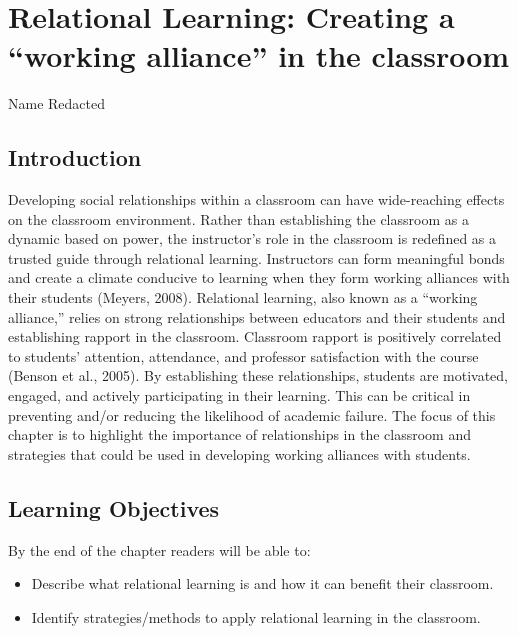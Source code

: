 \documentclass{book}
\begin{document}
\hypertarget{relational-learning-creating-a-working-alliance-in-the-classroom}{%
\chapter{Relational Learning: Creating a ``working alliance'' in the
classroom}\label{relational-learning-creating-a-working-alliance-in-the-classroom}}

Name Redacted

\hypertarget{introduction}{%
\section{Introduction}\label{introduction}}

Developing social relationships within a classroom can have wide-reaching
effects on the classroom environment. Rather than establishing the classroom
as a dynamic based on power, the instructor's role in the classroom is
redefined as a trusted guide through relational learning. Instructors can form
meaningful bonds and create a climate conducive to learning when they form
working alliances with their students (Meyers, 2008). Relational learning,
also known as a ``working alliance,'' relies on strong relationships between
educators and their students and establishing rapport in the classroom.
Classroom rapport is positively correlated to students' attention, attendance,
and professor satisfaction with the course (Benson et al., 2005). By
establishing these relationships, students are motivated, engaged, and
actively participating in their learning. This can be critical in preventing
and/or reducing the likelihood of academic failure. The focus of this chapter
is to highlight the importance of relationships in the classroom and
strategies that could be used in developing working alliances with students.

\hypertarget{learning-objectives}{%
\section{Learning Objectives}\label{learning-objectives}}

By the end of the chapter readers will be able to:

\begin{itemize}
\item
  Describe what relational learning is and how it can benefit their classroom.
\item
  Identify strategies/methods to apply relational learning in the classroom.
\end{itemize}
\end{document}
